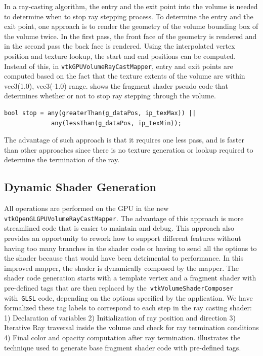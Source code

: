 
In a ray-casting algorithm, the entry and the exit point into the volume is
needed to determine when to stop ray stepping process. To determine the entry
and the exit point, one approach is to render the geometry of the volume
bounding box of the volume twice. In the first pass, the front face of the
geometry is rendered and in the second pass the back face is rendered.
Using the interpolated vertex position and
texture lookup, the start and end positions can be computed. Instead of this, in
\texttt{vtkGPUVolumeRayCastMapper}, entry and exit points are computed based on
the fact that the texture extents of the volume are within vec3(1.0), vec3(-1.0)
range. %
 shows the
fragment shader pseudo code that determines whether or not to stop ray stepping
through the volume.

\begin{lstlisting}[caption={Ray stop determination},
                   label=lst:raystop]
bool stop = any(greaterThan(g_dataPos, ip_texMax)) ||
             any(lessThan(g_dataPos, ip_texMin));
\end{lstlisting}

The advantage of such approach is that it requires one less pass, and is faster
than other approaches since there is no texture generation or lookup required
to determine the termination of the ray.


\subsection{Dynamic Shader Generation}
All operations are performed on the GPU in the new
\texttt{vtkOpenGLGPUVolumeRayCastMapper}. The advantage of this approach is more
streamlined code that is easier to maintain and debug. This approach also
provides an opportunity to rework how to support different features without
having too many branches in the shader code or having to send all the options to
the shader because that would have been detrimental to performance. In this
improved mapper, the shader is dynamically composed by the mapper. The shader
code generation starts with a template vertex and a fragment shader with
pre-defined tags that are then replaced by the~\texttt{vtkVolumeShaderComposer}
with~\texttt{GLSL} code, depending on the options specified by the application.
We have formalized these tag labels to correspond to each step in the ray
casting shader: 1) Declaration of variables 2) Initialization of ray position
and direction 3) Iterative Ray traversal inside the volume and check for ray
termination conditions 4) Final color and opacity computation after ray
termination.  illustrates the technique used to
generate base fragment shader code with pre-defined tags.

